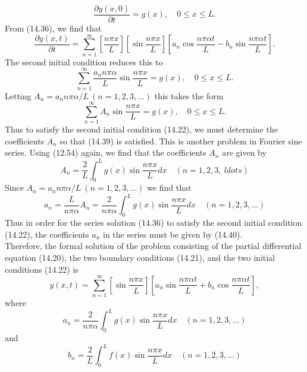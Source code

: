 \documentclass[11pt,a4paper, twoside]{report}
\begin{document}
	$$
	\frac{\partial y(x, 0)}{\partial t} = g(x),\quad 0 \leq x \leq L.
	$$
	From (14.36), we find that
	$$
	\frac{\partial y(x, t)}{\partial t} = \sum_{n=1}^{\infty}\left[\frac{n\pi x}{L}\right]\left[\sin \frac{n\pi x}{L}\right]\left[a_n\cos \frac{n\pi \alpha t}{L} - b_n\sin\frac{n\pi \alpha t}{L}\right].
	$$
	The second initial condition reduces this to
	$$
	\sum_{n=1}^\infty \frac{a_n n \pi \alpha}{L}\sin \frac{n\pi x}{L} = g(x),\quad 0\leq x \leq L.
	$$
	Letting $A_n = a_nn\pi\alpha/L\ (n=1,2,3,\ldots)$ this takes the form
	\begin{equation}\tag{14.39}\label{14.39}
		\sum_{n=1}^\infty A_n\sin \frac{n\pi x}{L} = g(x),\quad 0 \leq x \leq L.
	\end{equation}
	Thus to satisfy the second initial condition (14.22), we must determine the coefficients $A_n$ so that (14.39) is satisfied. This is another problem in Fourier sine series. Using (12.54) again, we find that the coefficients $A_n$ are given by
	$$
	A_n = \frac{2}{L}\int_0^Lg(x)\sin\frac{n\pi x}{L}dx\quad (n=1,2,3,\
	ldots)
	$$
	Since $A_n = a_nn\pi\alpha/L\ (n=1,2,3,\ldots)$ we find that
	\begin{equation}\tag{14.40}\label{14.40}
		a_n = \frac{L}{n\pi\alpha}A_n = \frac{2}{n\pi\alpha}\int_0^L g(x)\sin\frac{n\pi x}{L}dx\quad (n = 1,2,3,\ldots)
	\end{equation}
	Thus in order for the series solution (14.36) to satisfy the second initial condition  (14.22), the coefficients $a_n$ in the series must be given by (14.40).\\
	Therefore, the formal solution of the problem consisting of the partial differential  equation (14.20), the two boundary conditions (14.21), and the two initial conditions (14.22) is
	\begin{equation}\tag{14.36}
		y(x, t) = \sum_{n=1}^\infty \left[\sin\frac{n\pi x}{L}\right]\left[a_n\sin \frac{n\pi\alpha t}{L} + b_n\cos\frac{n\pi\alpha t}{L}\right],
	\end{equation}
	where
	\begin{equation}\tag{14.40}
		a_n = \frac{2}{n\pi \alpha}\int_0^L g(x)\sin\frac{n\pi x}{L}dx\quad (n = 1,2,3,\ldots)
	\end{equation}
	and
	\begin{equation}\tag{14.38}
		b_n = \frac{2}{L}\int_0^L f(x)\sin \frac{n\pi x}{L}dx\quad (n=1,2,3,\ldots)
	\end{equation}
\end{document}
